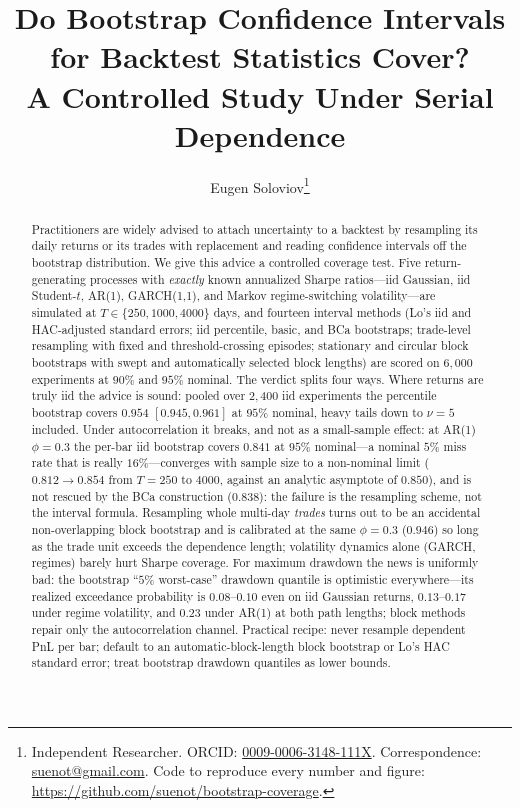 \documentclass[11pt]{article}
\title{\bfseries Do Bootstrap Confidence Intervals for Backtest Statistics
Cover?\\ A Controlled Study Under Serial Dependence}
\author{Eugen Soloviov\thanks{Independent Researcher. ORCID:
\href{https://orcid.org/0009-0006-3148-111X}{0009-0006-3148-111X}.
Correspondence: \href{mailto:suenot@gmail.com}{suenot@gmail.com}.
Code to reproduce every number and figure:
\url{https://github.com/suenot/bootstrap-coverage}.}}
\date{}
\begin{document}
\maketitle

\begin{abstract}
Practitioners are widely advised to attach uncertainty to a backtest by
resampling its daily returns or its trades with replacement and reading
confidence intervals off the bootstrap distribution. We give this advice a
controlled coverage test. Five return-generating processes with
\emph{exactly} known annualized Sharpe ratios---iid Gaussian, iid Student-$t$,
AR(1), GARCH(1,1), and Markov regime-switching volatility---are simulated at
$T\in\{250,1000,4000\}$ days, and fourteen interval methods (Lo's iid and
HAC-adjusted standard errors; iid percentile, basic, and BCa bootstraps;
trade-level resampling with fixed and threshold-crossing episodes; stationary
and circular block bootstraps with swept and automatically selected block
lengths) are scored on $6{,}000$ experiments at $90\%$ and $95\%$ nominal. The
verdict splits four ways. Where returns are truly iid the advice is sound:
pooled over $2{,}400$ iid experiments the percentile bootstrap covers $0.954$
$[0.945,0.961]$ at $95\%$ nominal, heavy tails down to $\nu=5$ included.
Under autocorrelation it breaks, and not as a small-sample effect: at
AR(1) $\phi=0.3$ the per-bar iid bootstrap covers $0.841$ at $95\%$
nominal---a nominal $5\%$ miss rate that is really $16\%$---converges with
sample size to a non-nominal limit ($0.812\to0.854$ from $T=250$ to $4000$,
against an analytic asymptote of $0.850$), and is not rescued by the BCa
construction ($0.838$): the failure is the resampling scheme, not the interval
formula. Resampling whole multi-day \emph{trades} turns out to be an
accidental non-overlapping block bootstrap and is calibrated at the same
$\phi=0.3$ ($0.946$) so long as the trade unit exceeds the dependence length;
volatility dynamics alone (GARCH, regimes) barely hurt Sharpe coverage. For
maximum drawdown the news is uniformly bad: the bootstrap ``$5\%$ worst-case''
drawdown quantile is optimistic everywhere---its realized exceedance
probability is $0.08$--$0.10$ even on iid Gaussian returns, $0.13$--$0.17$
under regime volatility, and $0.23$ under AR(1) at both path lengths; block
methods repair only the autocorrelation channel. Practical recipe: never
resample dependent PnL per bar; default to an automatic-block-length block
bootstrap or Lo's HAC standard error; treat bootstrap drawdown quantiles as
lower bounds.
\end{abstract}
\end{document}
